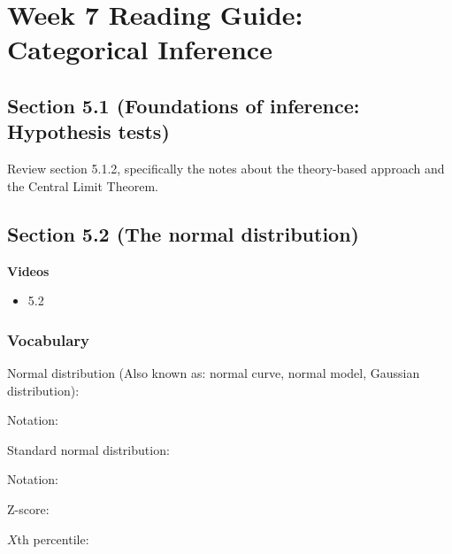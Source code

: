 \documentclass[
]{report}
\providecommand{\tightlist}{%
  \setlength{\itemsep}{0pt}\setlength{\parskip}{0pt}}
\newcommand{\rgs}{\vspace{12pt}} %
\newcommand{\rgi}{\hspace{24pt}}  %
\begin{document}
\hypertarget{week-7-reading-guide-categorical-inference}{%
\section{Week 7 Reading Guide: Categorical Inference}\label{week-7-reading-guide-categorical-inference}}

\hypertarget{section-5.1-foundations-of-inference-hypothesis-tests-1}{%
\subsection*{Section 5.1 (Foundations of inference: Hypothesis tests)}\label{section-5.1-foundations-of-inference-hypothesis-tests-1}}

Review section 5.1.2, specifically the notes about the theory-based approach and the Central Limit Theorem.

\hypertarget{section-5.2-the-normal-distribution}{%
\subsection*{Section 5.2 (The normal distribution)}\label{section-5.2-the-normal-distribution}}


\textbf{Videos}

\begin{itemize}
\tightlist
\item
  5.2
\end{itemize}


\hypertarget{vocabulary-11}{%
\subsubsection*{Vocabulary}\label{vocabulary-11}}

Normal distribution (Also known as: normal curve, normal model, Gaussian distribution):
\rgs

\rgi Notation:
\rgs

Standard normal distribution:
\rgs

\rgi Notation:
\rgs

Z-score:
\rgs

\(X\)th percentile:
\rgs
\end{document}
